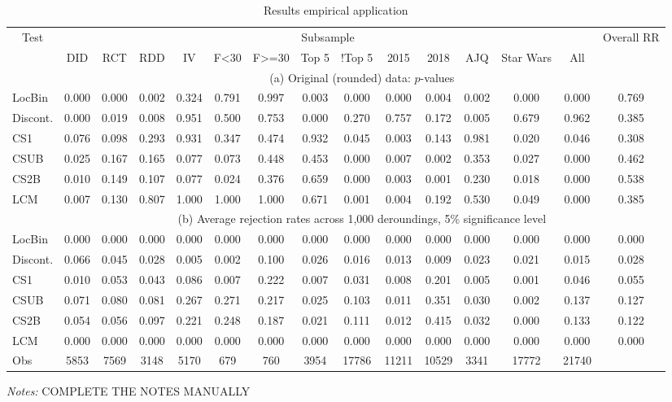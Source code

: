 \begin{table}[H]
\footnotesize
\caption{Results empirical application}
\label{tab:application}
\onehalfspacing
\begin{tabular}{lccccccccccccc c}
\toprule

\multicolumn{1}{c}{\multirow{2}{*}{Test}} & \multicolumn{13}{c}{Subsample} & \multicolumn{1}{c}{\multirow{2}{*}{Overall RR}} \\
\cline{2-14}
\multicolumn{1}{c}{} &DID &RCT &RDD &IV &F<30 &F>=30 &Top 5 &!Top 5 &2015 &2018 &AJQ &Star Wars &All \multicolumn{1}{c}{} \\
\midrule
& \multicolumn{14}{c}{(a) Original (rounded) data: $p$-values} \\
\cline{2-14}
LocBin     & 0.000 & 0.000 & 0.002 & 0.324 & 0.791 & 0.997 & 0.003 & 0.000 & 0.000 & 0.004 & 0.002 & 0.000 & 0.000 & 0.769 \\
Discont.   & 0.000 & 0.019 & 0.008 & 0.951 & 0.500 & 0.753 & 0.000 & 0.270 & 0.757 & 0.172 & 0.005 & 0.679 & 0.962 & 0.385 \\
CS1        & 0.076 & 0.098 & 0.293 & 0.931 & 0.347 & 0.474 & 0.932 & 0.045 & 0.003 & 0.143 & 0.981 & 0.020 & 0.046 & 0.308 \\
CSUB       & 0.025 & 0.167 & 0.165 & 0.077 & 0.073 & 0.448 & 0.453 & 0.000 & 0.007 & 0.002 & 0.353 & 0.027 & 0.000 & 0.462 \\
CS2B       & 0.010 & 0.149 & 0.107 & 0.077 & 0.024 & 0.376 & 0.659 & 0.000 & 0.003 & 0.001 & 0.230 & 0.018 & 0.000 & 0.538 \\
LCM        & 0.007 & 0.130 & 0.807 & 1.000 & 1.000 & 1.000 & 0.671 & 0.001 & 0.004 & 0.192 & 0.530 & 0.049 & 0.000 & 0.385 \\
\midrule
& \multicolumn{14}{c}{(b) Average rejection rates across 1,000 deroundings, 5\% significance level} \\
\cline{2-14}
LocBin     & 0.000 & 0.000 & 0.000 & 0.000 & 0.000 & 0.000 & 0.000 & 0.000 & 0.000 & 0.000 & 0.000 & 0.000 & 0.000 & 0.000 \\
Discont.   & 0.066 & 0.045 & 0.028 & 0.005 & 0.002 & 0.100 & 0.026 & 0.016 & 0.013 & 0.009 & 0.023 & 0.021 & 0.015 & 0.028 \\
CS1        & 0.010 & 0.053 & 0.043 & 0.086 & 0.007 & 0.222 & 0.007 & 0.031 & 0.008 & 0.201 & 0.005 & 0.001 & 0.046 & 0.055 \\
CSUB       & 0.071 & 0.080 & 0.081 & 0.267 & 0.271 & 0.217 & 0.025 & 0.103 & 0.011 & 0.351 & 0.030 & 0.002 & 0.137 & 0.127 \\
CS2B       & 0.054 & 0.056 & 0.097 & 0.221 & 0.248 & 0.187 & 0.021 & 0.111 & 0.012 & 0.415 & 0.032 & 0.000 & 0.133 & 0.122 \\
LCM        & 0.000 & 0.000 & 0.000 & 0.000 & 0.000 & 0.000 & 0.000 & 0.000 & 0.000 & 0.000 & 0.000 & 0.000 & 0.000 & 0.000 \\
\midrule
Obs & 5853 & 7569 & 3148 & 5170 & 679 & 760 & 3954 & 17786 & 11211 & 10529 & 3341 & 17772 & 21740 & \\
\bottomrule
\end{tabular}

\vspace{3mm}
\normalsize
\doublespacing
\textit{Notes:} COMPLETE THE NOTES MANUALLY
\end{table}
